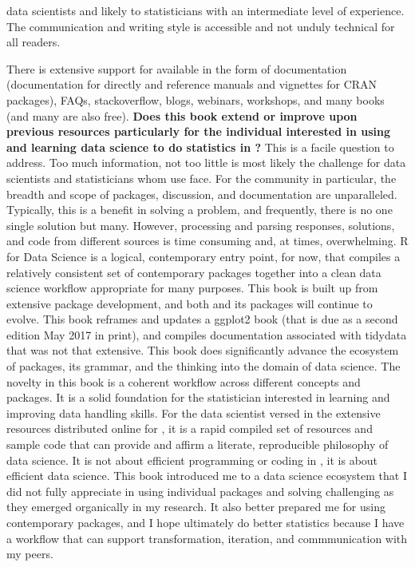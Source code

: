 \documentclass[bookreview]{jss}
\begin{document}
data scientists and likely to statisticians with an intermediate level of experience. The communication and writing style is accessible and not unduly technical for all readers.  \newline

There is extensive support for  available in the form of documentation (documentation for  directly and reference manuals and vignettes for CRAN packages), FAQs, stackoverflow, blogs, webinars, workshops, and many books (and many are also free). \textbf{Does this book extend or improve upon previous resources particularly for the individual interested in using and learning data science to do statistics in ?} This is a facile question to address. Too much information, not too little is most likely the challenge for data scientists and statisticians whom use  face. For the  community in particular, the breadth and scope of packages, discussion, and documentation are unparalleled. Typically, this is a benefit in solving a problem, and frequently, there is no one single solution but many. However, processing and parsing responses, solutions, and code from different sources is time consuming and, at times, overwhelming. R for Data Science is a logical, contemporary entry point, for now, that compiles a relatively consistent set of  contemporary packages together into a clean data science workflow appropriate for many purposes. This book is built up from extensive package development, and both  and its packages will continue to evolve. This book reframes and updates a ggplot2 book \cite{Wickham2009} (that is due as a second edition May 2017 in print), and compiles documentation associated with tidydata that was not that extensive. This book does significantly advance the ecosystem of packages, its grammar, and the thinking into the domain of data science. The novelty in this book is a coherent workflow across different concepts and packages. It is a solid foundation for the statistician interested in learning and improving data handling skills. For the data scientist versed in the extensive resources distributed online for , it is a rapid compiled set of resources and sample code that can provide and affirm a literate, reproducible philosophy of data science. It is not about efficient programming or coding in , it is about efficient data science. This book introduced me to a data science ecosystem that I did not fully appreciate in using individual packages and solving challenging as they emerged organically in my research. It also better prepared me for using contemporary  packages, and I hope ultimately do better statistics because I have a workflow that can support transformation, iteration, and commmunication with my peers. \newline 
\end{document}
